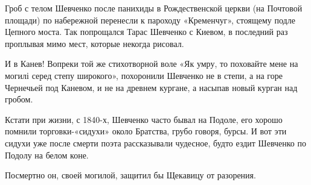 Гроб с телом Шевченко после панихиды в Рождественской церкви (на Почтовой площади) по набережной перенесли к пароходу «Кременчуг», стоящему подле Цепного моста. Так попрощался Тарас Шевченко с Киевом, в последний раз проплывая мимо мест, которые некогда рисовал.

И в Канев! Вопреки той же стихотворной воле «Як умру, то поховайте мене на могилі серед степу широкого», похоронили Шевченко не в степи, а на горе Чернечьей под Каневом, и не на древнем кургане, а насыпав новый курган над гробом. 

Кстати при жизни, с 1840-х, Шевченко часто бывал на Подоле, его хорошо помнили торговки-«сидухи» около Братства, грубо говоря, бурсы. И вот эти сидухи уже после смерти поэта рассказывали чудесное, будто ездит Шевченко по Подолу на белом коне. 

Посмертно он, своей могилой, защитил бы Щекавицу от разорения.
